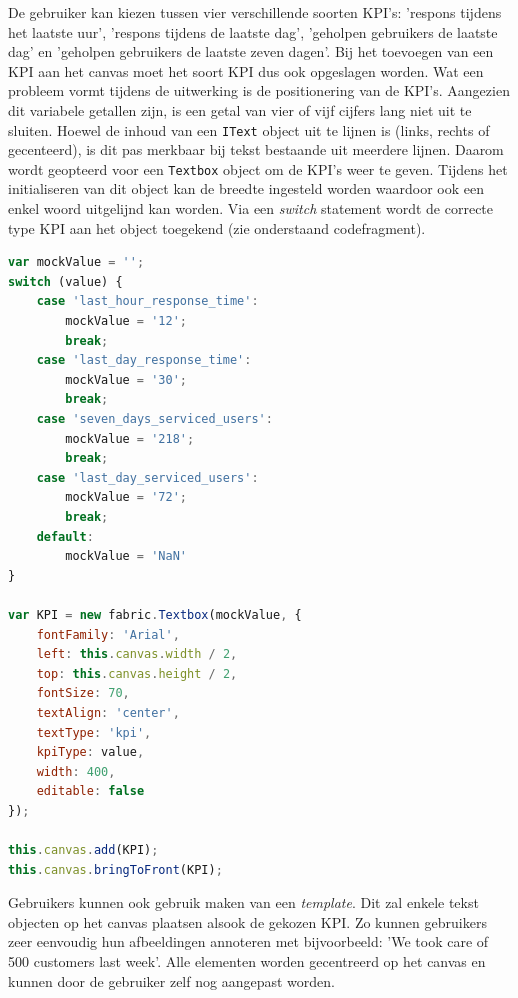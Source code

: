 De gebruiker kan kiezen tussen vier verschillende soorten KPI's: 'respons tijdens het laatste uur', 'respons tijdens de laatste dag', 'geholpen gebruikers de laatste dag' en 'geholpen gebruikers de laatste zeven dagen'. Bij het toevoegen van een KPI aan het canvas moet het soort KPI dus ook opgeslagen worden.%
Wat een probleem vormt tijdens de uitwerking is de positionering van de KPI's. Aangezien dit variabele getallen zijn, is een getal van vier of vijf cijfers lang niet uit te sluiten. Hoewel de inhoud van een \texttt{IText} object uit te lijnen is (links, rechts of gecenteerd), is dit pas merkbaar bij tekst bestaande uit meerdere lijnen. Daarom wordt geopteerd voor een \texttt{Textbox} object om de KPI's weer te geven. Tijdens het initialiseren van dit object kan de breedte ingesteld worden waardoor ook een enkel woord uitgelijnd kan worden. Via een \textit{switch} statement wordt de correcte type KPI aan het object toegekend (zie onderstaand codefragment). 

\begin{lstlisting}[language=javascript]
var mockValue = '';
switch (value) {
	case 'last_hour_response_time':
		mockValue = '12';
		break;
	case 'last_day_response_time':
		mockValue = '30';
		break;
	case 'seven_days_serviced_users':
		mockValue = '218';
		break;
	case 'last_day_serviced_users':
		mockValue = '72';
		break;
	default:
		mockValue = 'NaN'
}

var KPI = new fabric.Textbox(mockValue, {
	fontFamily: 'Arial',
	left: this.canvas.width / 2,
	top: this.canvas.height / 2,
	fontSize: 70,
	textAlign: 'center',
	textType: 'kpi',
	kpiType: value,
	width: 400,
	editable: false
});

this.canvas.add(KPI);
this.canvas.bringToFront(KPI);
\end{lstlisting}

Gebruikers kunnen ook gebruik maken van een \textit{template}. Dit zal enkele tekst objecten op het canvas plaatsen alsook de gekozen KPI. Zo kunnen gebruikers zeer eenvoudig hun afbeeldingen annoteren met bijvoorbeeld: 'We took care of 500 customers last week'. Alle elementen worden gecentreerd op het canvas en kunnen door de gebruiker zelf nog aangepast worden. 

